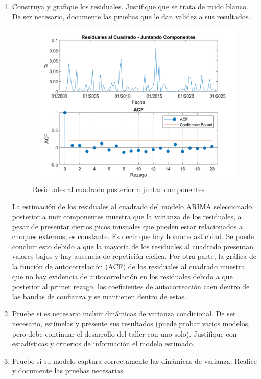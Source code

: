 \documentclass{article}
\theoremstyle{remark}
\theoremstyle{definition}
\begin{document}
\begin{enumerate}[label=\emph{\alph*})]
        
    \item {Construya y grafique los residuales. Justifique que se trata de ruido blanco. De ser necesario, documente las pruebas que le dan validez a sus resultados.}
        \begin{tcolorbox}[title=Soluci\'on 3.f]
            \begin{figure}[H]
                \centering
                \includegraphics[width=0.5\linewidth]{docs/ARIMA_2_0_9_residuales.png}
                \caption{Residuales al cuadrado posterior a juntar componentes}
                \label{fig:enter-label}
            \end{figure}
            La estimación de los residuales al cuadrado del modelo ARIMA seleccionado posterior a unir componentes muestra que la varianza de los residuales, a pesar de presentar ciertos picos inusuales que pueden estar relacionados a choques externos, es constante. Es decir que hay homocedasticidad. Se puede concluir esto debido a que la mayoría de los residuales al cuadrado presentan valores bajos y hay ausencia de repetición cíclica. Por otra parte, la gráfica de la función de autocorrelación (ACF) de los residuales al cuadrado muestra que no hay evidencia de autocorrelación en los residuales debido a que posterior al primer rezago, los coeficientes de autocorreación caen dentro de las bandas de confianza y se mantienen dentro de estas. 
            
        \end{tcolorbox}
        
    \item {Pruebe si es necesario incluir din\'amicas de varianza condicional. De ser necesario, est\'imelas y presente sus resultados (puede probar varios modelos, pero debe continuar el desarrollo del taller con uno solo). Justifique con estad\'isticas y criterios de informaci\'on el modelo estimado.}
        \begin{tcolorbox}[title=Soluci\'on 3.g]
            
        \end{tcolorbox}
    \item {Pruebe si su modelo captura correctamente las din\'amicas de varianza. Realice y documente las pruebas necesarias.}
        \begin{tcolorbox}[title=Soluci\'on 3.h]
            

\end{tcolorbox}
\end{enumerate}
\end{document}
